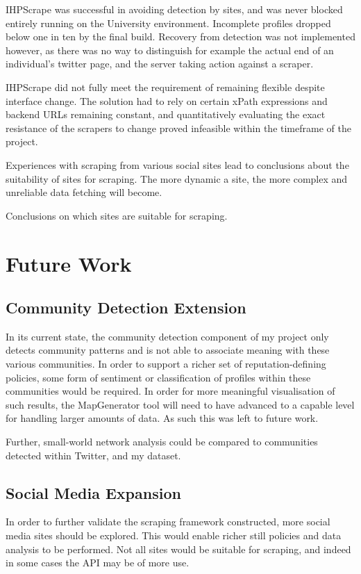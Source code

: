 IHPScrape was successful in avoiding detection by sites, and was never blocked entirely running on the University environment. Incomplete profiles dropped below one in ten by the final build. Recovery from detection was not implemented however, as there was no way to distinguish for example the actual end of an individual's twitter page, and the server taking action against a scraper.

IHPScrape did not fully meet the requirement of remaining flexible despite interface change. The solution had to rely on certain xPath expressions and backend URLs remaining constant, and quantitatively evaluating the exact resistance of the scrapers to change proved infeasible within the timeframe of the project. 

Experiences with scraping from various social sites lead to conclusions about the suitability of sites for scraping. The more dynamic a site, the more complex and unreliable data fetching will become. 

Conclusions on which sites are suitable for scraping.


\section{Future Work}

\subsection{Community Detection Extension}

In its current state, the community detection component of my project only detects community patterns and is not able to associate meaning with these various communities. In order to support a richer set of reputation-defining policies, some form of sentiment or classification of profiles within these communities would be required. In order for more meaningful visualisation of such results, the MapGenerator tool will need to have advanced to a capable level for handling larger amounts of data. As such this was left to future work.

Further, small-world network analysis could be compared to communities detected within Twitter, and my dataset. 

\subsection{Social Media Expansion}

In order to further validate the scraping framework constructed, more social media sites should be explored. This would enable richer still policies and data analysis to be performed. Not all sites would be suitable for scraping, and indeed in some cases the API may be of more use.

